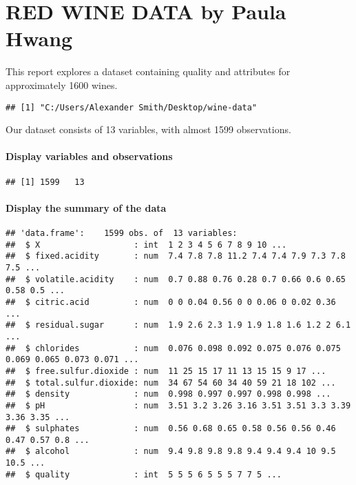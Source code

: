 \documentclass[]{article}
\title{}
\author{}
\date{}
\let\oldparagraph\paragraph
\renewcommand{\paragraph}[1]{\oldparagraph{#1}\mbox{}}
\begin{document}
\section{RED WINE DATA by Paula
Hwang}\label{red-wine-data-by-paula-hwang}

This report explores a dataset containing quality and attributes for
approximately 1600 wines.

\begin{verbatim}
## [1] "C:/Users/Alexander Smith/Desktop/wine-data"
\end{verbatim}

Our dataset consists of 13 variables, with almost 1599 observations.

\paragraph{Display variables and
observations}\label{display-variables-and-observations}

\begin{verbatim}
## [1] 1599   13
\end{verbatim}

\paragraph{Display the summary of the
data}\label{display-the-summary-of-the-data}

\begin{verbatim}
## 'data.frame':    1599 obs. of  13 variables:
##  $ X                   : int  1 2 3 4 5 6 7 8 9 10 ...
##  $ fixed.acidity       : num  7.4 7.8 7.8 11.2 7.4 7.4 7.9 7.3 7.8 7.5 ...
##  $ volatile.acidity    : num  0.7 0.88 0.76 0.28 0.7 0.66 0.6 0.65 0.58 0.5 ...
##  $ citric.acid         : num  0 0 0.04 0.56 0 0 0.06 0 0.02 0.36 ...
##  $ residual.sugar      : num  1.9 2.6 2.3 1.9 1.9 1.8 1.6 1.2 2 6.1 ...
##  $ chlorides           : num  0.076 0.098 0.092 0.075 0.076 0.075 0.069 0.065 0.073 0.071 ...
##  $ free.sulfur.dioxide : num  11 25 15 17 11 13 15 15 9 17 ...
##  $ total.sulfur.dioxide: num  34 67 54 60 34 40 59 21 18 102 ...
##  $ density             : num  0.998 0.997 0.997 0.998 0.998 ...
##  $ pH                  : num  3.51 3.2 3.26 3.16 3.51 3.51 3.3 3.39 3.36 3.35 ...
##  $ sulphates           : num  0.56 0.68 0.65 0.58 0.56 0.56 0.46 0.47 0.57 0.8 ...
##  $ alcohol             : num  9.4 9.8 9.8 9.8 9.4 9.4 9.4 10 9.5 10.5 ...
##  $ quality             : int  5 5 5 6 5 5 5 7 7 5 ...
\end{verbatim}
\end{document}
